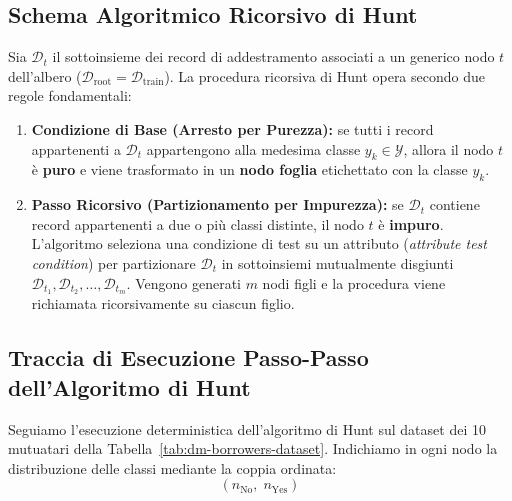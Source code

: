 \FloatBarrier
\subsection{Schema Algoritmico Ricorsivo di Hunt}
\label{subsec:dm-hunt-schema}

Sia $\mathcal{D}_t$ il sottoinsieme dei record di addestramento associati a un generico nodo $t$ dell'albero ($\mathcal{D}_{\text{root}} = \mathcal{D}_{\text{train}}$). La procedura ricorsiva di Hunt opera secondo due regole fondamentali:

\begin{enumerate}
    \item \textbf{Condizione di Base (Arresto per Purezza):} se tutti i record appartenenti a $\mathcal{D}_t$ appartengono alla medesima classe $y_k \in \mathcal{Y}$, allora il nodo $t$ è \textbf{puro} e viene trasformato in un \textbf{nodo foglia} etichettato con la classe $y_k$.
    \item \textbf{Passo Ricorsivo (Partizionamento per Impurezza):} se $\mathcal{D}_t$ contiene record appartenenti a due o più classi distinte, il nodo $t$ è \textbf{impuro}. L'algoritmo seleziona una condizione di test su un attributo (\textit{attribute test condition}) per partizionare $\mathcal{D}_t$ in sottoinsiemi mutualmente disgiunti $\mathcal{D}_{t_1}, \mathcal{D}_{t_2}, \dots, \mathcal{D}_{t_m}$. Vengono generati $m$ nodi figli e la procedura viene richiamata ricorsivamente su ciascun figlio.
\end{enumerate}

\FloatBarrier
\subsection{Traccia di Esecuzione Passo-Passo dell'Algoritmo di Hunt}
\label{subsec:dm-hunt-step-by-step}

Seguiamo l'esecuzione deterministica dell'algoritmo di Hunt sul dataset dei 10 mutuatari della Tabella~\ref{tab:dm-borrowers-dataset}. Indichiamo in ogni nodo la distribuzione delle classi mediante la coppia ordinata:
\begin{equation}
    (n_{\text{No}}, \; n_{\text{Yes}})
\end{equation}

